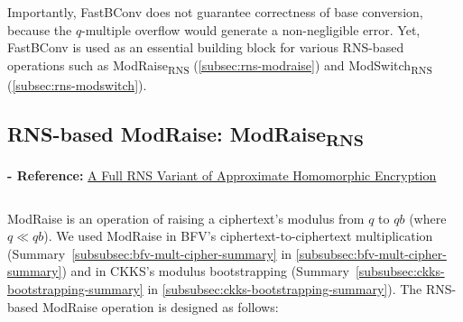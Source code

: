 \begin{myproof}
Importantly, \textsf{FastBConv} does not guarantee correctness of base conversion, because the $q$-multiple overflow would generate a non-negligible error. Yet, \textsf{FastBConv} is used as an essential building block for various RNS-based operations such as \textsf{ModRaise\textsubscript{RNS}} (\autoref{subsec:rns-modraise}) and \textsf{ModSwitch\textsubscript{RNS}} (\autoref{subsec:rns-modswitch}).  

\end{myproof}






\subsection{RNS-based ModRaise: \textsf{ModRaise\textsubscript{RNS}}}
\label{subsec:rns-modraise}

\noindent \textbf{- Reference:} 
\href{https://eprint.iacr.org/2018/931.pdf}{A Full RNS Variant of
Approximate Homomorphic Encryption}~\cite{rns-ckks}

$ $

\textsf{ModRaise} is an operation of raising a ciphertext's modulus from $q$ to $qb$ (where $q \ll qb$). We used \textsf{ModRaise} in BFV's ciphertext-to-ciphertext multiplication (Summary~\ref*{subsubsec:bfv-mult-cipher-summary} in \autoref{subsubsec:bfv-mult-cipher-summary}) and in CKKS's modulus bootstrapping (Summary~\ref*{subsubsec:ckks-bootstrapping-summary} in \autoref{subsubsec:ckks-bootstrapping-summary}). The RNS-based \textsf{ModRaise} operation is designed as follows:


